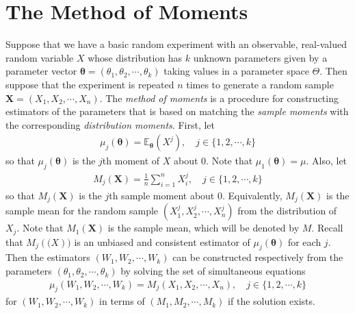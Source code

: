 \documentclass[a4paper,12pt]{article}
\theoremstyle{definition}
\theoremstyle{definition}
\theoremstyle{definition}
\newcommand{\bs}{\boldsymbol}
\begin{document}
\section{The Method of Moments}
    Suppose that we have a basic random experiment with an observable, real-valued random variable $X$ whose distribution has $k$ unknown parameters given by a parameter vector $\bs{\theta} = (\theta_1, \theta_2, \cdots, \theta_k)$ taking values in a parameter space $\Theta$. Then suppose that the experiment is repeated $n$ times to generate a random sample $\bs{X} = (X_1, X_2, \cdots, X_n)$. The \textit{method of moments} is a procedure for constructing estimators of the parameters that is based on matching the \textit{sample moments} with the corresponding \textit{distribution moments}. First, let
    \begin{align*}
        \mu_j(\bs{\theta}) = \mathbb{E}_{\bs{\theta}} \left( X^j \right), \quad j \in \{ 1, 2, \cdots, k \}
    \end{align*}
    so that $\mu_j(\bs{\theta})$ is the $j$th moment of $X$ about $0$. Note that $\mu_1(\bs{\theta}) = \mu$. Also, let
    \begin{align*}
        M_j(\bs{X}) = \frac{1}{n} \sum_{i = 1}^n X_i^j, \quad j \in \{ 1, 2, \cdots, k \}
    \end{align*}
    so that $M_j(\bs{X})$ is the $j$th sample moment about $0$. Equivalently, $M_j(\bs{X})$ is the sample mean for the random sample $\left( X_1^j, X_2^j, \cdots, X_n^j \right)$ from the distribution of $X_j$. Note that $M_1(\bs{X})$ is the sample mean, which will be denoted by $M$.
    Recall that $M_j(\bs(X))$ is an unbiased and consistent estimator of $\mu_j(\bs{\theta})$ for each $j$. Then the estimators $(W_1, W_2, \cdots, W_k)$ can be constructed respectively from the parameters $(\theta_1, \theta_2, \cdots, \theta_k)$ by solving the set of simultaneous equations
    \begin{align*}
        \mu_j (W_1, W_2, \cdots, W_k) = M_j (X_1, X_2, \cdots, X_n), \quad j \in \{1, 2, \cdots, k\}
    \end{align*}
    for $(W_1, W_2, \cdots, W_k)$ in terms of $(M_1, M_2, \cdots, M_k)$ if the solution exists. \par
\end{document}

